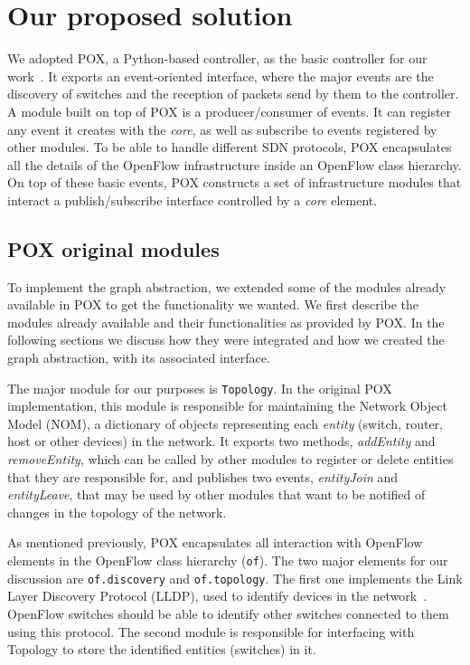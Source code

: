 \section{Our proposed solution}

We adopted POX, a Python-based controller,
as the basic controller for our work~\cite{pox}. It exports an
event-oriented interface, where the major events are the discovery of
switches and the reception of packets send by them to the
controller.
A module built on top of POX is a producer/consumer of events.
It can register
any event it creates with the \emph{core}, as well as subscribe to 
events registered by other modules.
To be able to handle different SDN protocols, POX encapsulates
all the details of the OpenFlow infrastructure inside an OpenFlow class
hierarchy.
On top of these basic events, POX constructs a set of
infrastructure modules that interact a publish/subscribe 
interface controlled by a \emph{core} element.

\subsection{POX original modules}

To implement the graph abstraction, we extended some of the modules already
available in POX to get the functionality we wanted. We first describe the
modules already available and their functionalities as provided by POX.
In the following sections we discuss how they were integrated and
how we created the
graph abstraction, with its associated interface.

The major module for our purposes is \texttt{Topology}. In the original POX
implementation, this module is responsible for maintaining the Network
Object Model (NOM), a dictionary of objects representing each \emph{entity}
(switch, router, host or other devices) in the network.
It
exports two 
methods, \emph{addEntity} and \emph{removeEntity}, which can be called by
other modules to register or delete entities that they are responsible for,
and
publishes two events, \emph{entityJoin} and \emph{entityLeave}, that may be
used by other modules that want to be notified of changes in the topology
of the network.

As mentioned previously, POX encapsulates all interaction with OpenFlow
elements in the OpenFlow class hierarchy (\texttt{of}).
The two major elements for our discussion are \texttt{of.discovery} and
\texttt{of.topology}. The first one implements the Link Layer Discovery
Protocol (LLDP), used to identify devices in the network~\cite{lldp}.
OpenFlow switches
should be able to identify other switches connected to them using this
protocol. The second module is responsible for interfacing with Topology to
store the identified entities (switches) in it.

